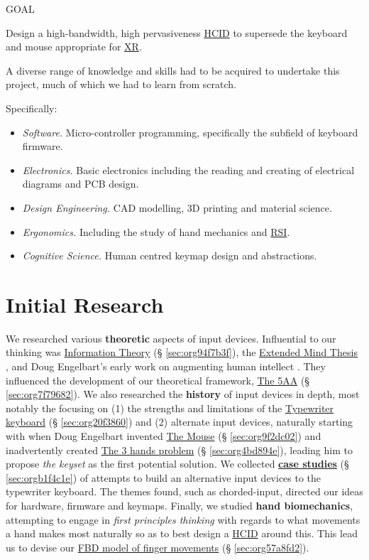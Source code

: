 \documentclass[logo,bsc,singlespacing,parskip]{infthesis}
\begin{document}
\begin{mdframed}
\begin{description}
\item[{GOAL}] 
\end{description}

Design a high-bandwidth, high pervasiveness \hyperref[org0c83164]{HCID} to supersede the keyboard and mouse appropriate for \hyperref[org39cbd51]{XR}.
\end{mdframed}

A diverse range of knowledge and skills had to be acquired to undertake this project, much of which we had to learn from scratch.

Specifically:
\begin{itemize}
\item \emph{Software.} Micro-controller programming, specifically the subfield of keyboard firmware.
\item \emph{Electronics.} Basic electronics including the reading and creating of electrical diagrams and PCB design.
\item \emph{Design Engineering.} CAD modelling, 3D printing and material science.
\item \emph{Ergonomics.} Including the study of hand mechanics and \hyperref[org77f0234]{RSI}.
\item \emph{Cognitive Science.} Human centred keymap design and abstractions.
\end{itemize}
\chapter{Initial Research}
\label{sec:orge0c8edf}
We researched various \textbf{theoretic} aspects of input devices.
Influential to our thinking was \hyperref[sec:org94f7b3f]{Information Theory} (§ \ref{sec:org94f7b3f}), the \hyperref[extended mind thesis]{Extended Mind Thesis} \autocite{ExtendedMindAndy}, and Doug Engelbart's early work on augmenting human intellect \autocite{engelbartAugmentingHumanIntellect1962}.
They influenced the development of our theoretical framework, \hyperref[sec:org7f79682]{The 5AA} (§ \ref{sec:org7f79682}).
We also researched the \textbf{history} of input devices in depth, most notably the focusing on (1) the strengths and limitations of the \hyperref[sec:org20f3860]{Typewriter keyboard} (§ \ref{sec:org20f3860}) and (2) alternate input devices, naturally starting with when Doug Engelbart invented \hyperref[sec:org9f2dc02]{The Mouse} (§ \ref{sec:org9f2dc02}) and inadvertently created \hyperref[sec:org4bd894e]{The 3 hands problem} (§ \ref{sec:org4bd894e}), leading him to propose \emph{the keyset} as the first potential solution.
We collected \hyperref[sec:orgb1f4c1e]{\textbf{case studies}} (§ \ref{sec:orgb1f4c1e}) of attempts to build an alternative input devices to the typewriter keyboard.
The themes found, such as chorded-input, directed our ideas for hardware, firmware and keymaps.
Finally, we studied \textbf{hand biomechanics}, attempting to engage in \emph{first principles thinking} with regards to what movements a hand makes most naturally so as to best design a \hyperref[org0c83164]{HCID} around this.
This lead us to devise our \hyperref[sec:org57a8fd2]{FBD model of finger movements} (§ \ref{sec:org57a8fd2}).
\end{document}
